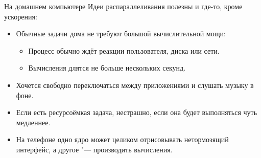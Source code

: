 \begin{frame}{На домашнем компьютере}
	Идеи распараллеливания полезны и где-то, кроме ускорения:
	\begin{itemize}
		\item
			Обычные задачи дома не требуют большой вычислительной мощи:
			\begin{itemize}
				\item Процесс обычно ждёт реакции пользователя, диска или сети.
				\item Вычисления длятся не больше нескольких секунд.
			\end{itemize}
		\item Хочется свободно переключаться между приложениями и слушать музыку в фоне.
		\item Если есть ресурсоёмкая задача, нестрашно, если она будет выполняться чуть медленнее.
		\item На телефоне одно ядро может целиком отрисовывать нетормозящий интерфейс, а другое "--- производить вычисления.
	\end{itemize}
\end{frame}
